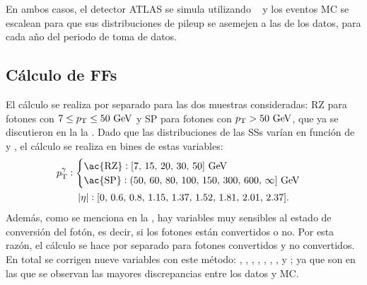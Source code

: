 En ambos casos, el detector \ac{ATLAS} se simula utilizando \GEANT~\cite{Geant4} y los eventos \ac{MC} se escalean para que sus distribuciones de pileup se asemejen a las de los datos, para cada año del periodo de toma de datos.


\subsection{C\'alculo de \acfp{FF}}
\label{subsec:ss_corrections:ffs:calculation}





El cálculo se realiza por separado para las dos muestras consideradas: \ac{RZ} para fotones con \(7\leq p_{\text{T}}\leq 50~\text{GeV}\) y \ac{SP} para fotones con \(p_{\text{T}}> 50~\text{GeV}\), que ya se discutieron en la la \Sect{\ref{subsec:pid_ss:pid:event_selection}}. Dado que las distribuciones de las \acp{SS} varían en función de \pt y \abseta, el cálculo se realiza en bines de estas variables:
\begin{gather*}
    \ptgam:
    \begin{cases}
        \text{\ac{RZ}}: [7,\, 15,\, 20,\, 30,\, 50] ~\gev\\
        \text{\ac{SP}}: (50,\, 60,\, 80,\, 100,\, 150,\, 300,\, 600,\, \infty] ~\gev\\
    \end{cases}\\
    \abseta: [0,\, 0.6,\, 0.8,\, 1.15,\, 1.37,\, 1.52,\, 1.81,\, 2.01,\, 2.37].
\end{gather*}
Además, como se menciona en la \Sect{\ref{sec:pid_ss:ss}}, hay variables muy sensibles al estado de conversión del fotón, es decir, si los fotones están convertidos o no. Por esta razón, el cálculo se hace por separado para fotones convertidos y no convertidos. En total se corrigen nueve variables con este método: \eratio, \fside, \reta, \rphi, \rhad, \rhado, \wone, \weta y \wstot; ya que son en las que se observan las mayores discrepancias entre los datos y \ac{MC}.

